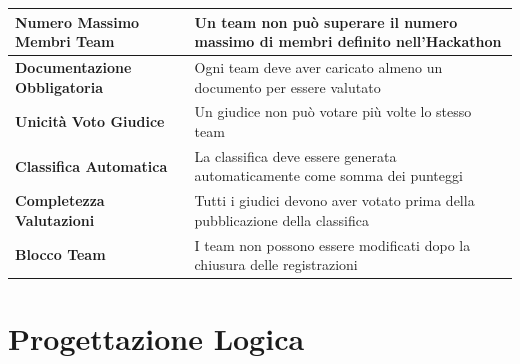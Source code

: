 \documentclass[a4paper, 10pt]{article}
\begin{document}
{\begin{longtable}{
				>{\raggedright\arraybackslash}p{5.5cm}
				>{\raggedright\arraybackslash}p{10cm}
			}
			\textbf{Numero Massimo Membri Team} &
			Un team non può superare il numero massimo di membri definito nell'Hackathon \\
			\hline
			
			\textbf{Documentazione Obbligatoria} &
			Ogni team deve aver caricato almeno un documento per essere valutato \\
			\hline
			
			\textbf{Unicità Voto Giudice} &
			Un giudice non può votare più volte lo stesso team\\
			\hline
			
			\textbf{Classifica Automatica} &
			La classifica deve essere generata automaticamente come somma dei punteggi\\
			\hline
			
			\textbf{Completezza Valutazioni} &
			Tutti i giudici devono aver votato prima della pubblicazione della classifica \\
			\hline
			
			\textbf{Blocco Team} &
			I team non possono essere modificati dopo la chiusura delle registrazioni
		\end{longtable}
	}
	\newpage
	\section{Progettazione Logica}
\end{document}
